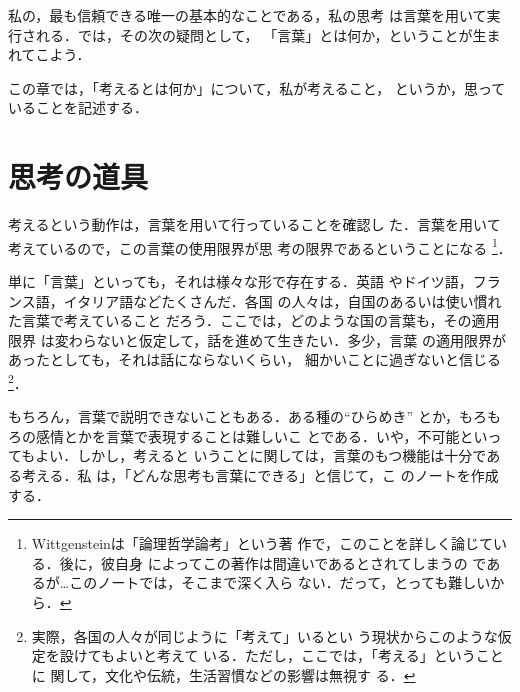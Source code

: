             私の，最も信頼できる唯一の基本的なことである，私の思考
            は言葉を用いて実行される．では，その次の疑問として，
            「言葉」とは何か，ということが生まれてこよう．

            この章では，「考えるとは何か」について，私が考えること，
            というか，思っていることを記述する．


        \section{思考の道具}
            考えるという動作は，言葉を用いて行っていることを確認し
            た．言葉を用いて考えているので，この言葉の使用限界が思
            考の限界であるということになる
                \footnote{
                    Wittgensteinは「論理哲学論考」という著
                    作で，このことを詳しく論じている．後に，彼自身
                    によってこの著作は間違いであるとされてしまうの
                    であるが…このノートでは，そこまで深く入ら
                    ない．だって，とっても難しいから．
                }．

            単に「言葉」といっても，それは様々な形で存在する．英語
            やドイツ語，フランス語，イタリア語などたくさんだ．各国
            の人々は，自国のあるいは使い慣れた言葉で考えていること
            だろう．ここでは，どのような国の言葉も，その適用限界
            は変わらないと仮定して，話を進めて生きたい．多少，言葉
            の適用限界があったとしても，それは話にならないくらい，
            細かいことに過ぎないと信じる
                \footnote{
                    実際，各国の人々が同じように「考えて」いるとい
                    う現状からこのような仮定を設けてもよいと考えて
                    いる．ただし，ここでは，「考える」ということに
                    関して，文化や伝統，生活習慣などの影響は無視す
                    る．
                }．

             もちろん，言葉で説明できないこともある．ある種の“ひらめき”
             とか，もろもろの感情とかを言葉で表現することは難しいこ
             とである．いや，不可能といってもよい．しかし，考えると
             いうことに関しては，言葉のもつ機能は十分である考える．私
             は，「どんな思考も言葉にできる」と信じて，こ
             のノートを作成する．


